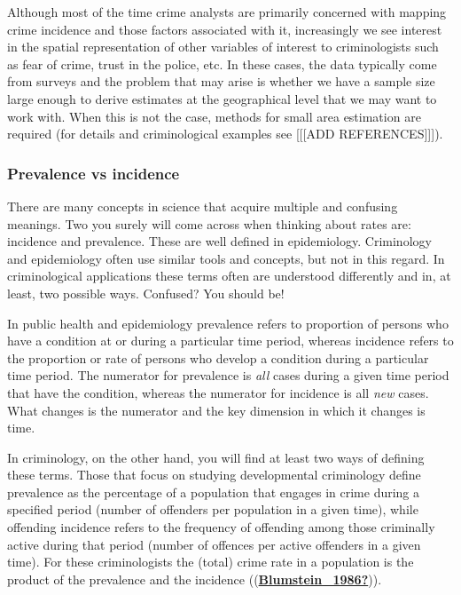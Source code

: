 \documentclass[
]{book}
\begin{document}
Although most of the time crime analysts are primarily concerned with mapping crime incidence and those factors associated with it, increasingly we see interest in the spatial representation of other variables of interest to criminologists such as fear of crime, trust in the police, etc. In these cases, the data typically come from surveys and the problem that may arise is whether we have a sample size large enough to derive estimates at the geographical level that we may want to work with. When this is not the case, methods for small area estimation are required (for details and criminological examples see {[}{[}{[}ADD REFERENCES{]}{]}{]}).

\hypertarget{prevalence-vs-incidence}{%
\subsubsection{Prevalence vs incidence}\label{prevalence-vs-incidence}}

There are many concepts in science that acquire multiple and confusing meanings. Two you surely will come across when thinking about rates are: incidence and prevalence. These are well defined in epidemiology. Criminology and epidemiology often use similar tools and concepts, but not in this regard. In criminological applications these terms often are understood differently and in, at least, two possible ways. Confused? You should be!

In public health and epidemiology prevalence refers to proportion of persons who have a condition at or during a particular time period, whereas incidence refers to the proportion or rate of persons who develop a condition during a particular time period. The numerator for prevalence is \emph{all} cases during a given time period that have the condition, whereas the numerator for incidence is all \emph{new} cases. What changes is the numerator and the key dimension in which it changes is time.

In criminology, on the other hand, you will find at least two ways of defining these terms. Those that focus on studying developmental criminology define prevalence as the percentage of a population that engages in crime during a specified period (number of offenders per population in a given time), while offending incidence refers to the frequency of offending among those criminally active during that period (number of offences per active offenders in a given time). For these criminologists the (total) crime rate in a population is the product of the prevalence and the incidence ((\protect\hyperlink{ref-Blumstein_1986}{\textbf{Blumstein\_1986?}})).
\end{document}
